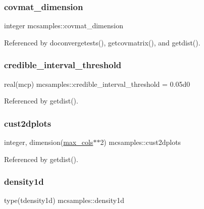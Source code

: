 \subsubsection{\texorpdfstring{covmat\+\_\+dimension}{covmat\_dimension}}
{\footnotesize\ttfamily integer mcsamples\+::covmat\+\_\+dimension}



Referenced by doconvergetests(), getcovmatrix(), and getdist().

\mbox{\label{namespacemcsamples_ae1862ffcd750637a6e92a95ec020c591}} 
\subsubsection{\texorpdfstring{credible\+\_\+interval\+\_\+threshold}{credible\_interval\_threshold}}
{\footnotesize\ttfamily real(mcp) mcsamples\+::credible\+\_\+interval\+\_\+threshold = 0.\+05d0}



Referenced by getdist().

\mbox{\label{namespacemcsamples_a1831bdf8091941b6ccbd0c3fc3df90f9}} 
\subsubsection{\texorpdfstring{cust2dplots}{cust2dplots}}
{\footnotesize\ttfamily integer, dimension(\mbox{\hyperlink{namespacemcsamples_ae8386bad918d8af8d203683c01d5818c}{max\+\_\+cols}}$\ast$$\ast$2) mcsamples\+::cust2dplots}



Referenced by getdist().

\mbox{\label{namespacemcsamples_aa7682e36ef34bef4b8112f058f435415}} 
\subsubsection{\texorpdfstring{density1d}{density1d}}
{\footnotesize\ttfamily type(tdensity1d) mcsamples\+::density1d}



